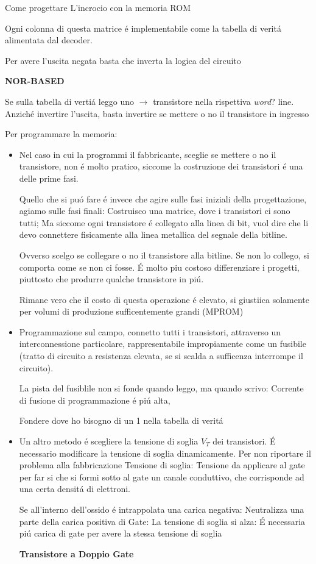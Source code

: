 \documentclass{article}
\begin{document}
Come progettare L'incrocio con la memoria ROM

Ogni colonna di questa matrice \'e implementabile come la tabella di verit\'a alimentata dal decoder.

Per avere l'uscita negata basta che inverta la logica del circuito

\textbf{NOR-BASED}

Se sulla tabella di verti\'a leggo uno $\rightarrow$ transistore nella rispettiva \textit{word}? line.
Anzich\'e invertire l'uscita, basta invertire se mettere o no il transistore in ingresso

Per programmare la memoria:

\begin{itemize}
    \item
        Nel caso in cui la programmi il fabbricante, sceglie se mettere o no il transistore, non \'e molto pratico, siccome la costruzione dei transistori \'e una delle prime fasi.

        Quello che si pu\'o fare \'e invece che agire sulle fasi iniziali della progettazione, agiamo sulle fasi finali: Costruisco una matrice, dove i transistori ci sono tutti; Ma siccome ogni transistore \'e collegato alla linea di bit, vuol dire che li devo connettere fisicamente alla linea metallica del segnale della bitline.

        Ovverso scelgo se collegare o no il transistore alla bitline. Se non lo collego, si comporta come se non ci fosse.
        \'E molto piu costoso differenziare i progetti, piuttosto che produrre qualche transistore in pi\'u.

        Rimane vero che il costo di questa operazione \'e elevato, si giustiica solamente per volumi di produzione sufficentemente grandi (MPROM)

    \item Programmazione sul campo, connetto tutti i transistori, attraverso un interconnessione particolare, rappresentabile impropiamente come un fusibile (tratto di circuito a resistenza elevata, se si scalda a sufficenza interrompe il circuito).

        La pista del fusiblile non si fonde quando leggo, ma quando scrivo: Corrente di fusione di programmazione \'e pi\'u alta,

        Fondere dove ho bisogno di un 1 nella tabella di verit\'a

    \item  Un altro metodo \'e scegliere la tensione di soglia $V_T$ dei transistori.
        \'E necessario modificare la tensione di soglia dinamicamente. Per non riportare il problema alla fabbricazione
        Tensione di soglia: Tensione da applicare al gate per far si che si formi sotto al gate un canale conduttivo, che corrisponde ad una certa densit\'a di elettroni.

        Se all'interno dell'ossido \'e intrappolata una carica negativa: Neutralizza una parte della carica positiva di Gate: La tensione di soglia si alza: \'E necessaria pi\'u carica di gate per avere la stessa tensione di soglia

        \textbf{Transistore a Doppio Gate}
\end{itemize}
\end{document}
